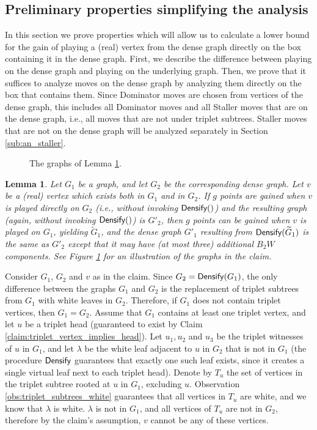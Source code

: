 \documentclass[11pt]{article}
\def\Proof{\par\noindent{\bf Proof:~}}
\newtheorem{lemma}[theorem]{Lemma}
\theoremstyle{definition}
\def\densify{\mbox{\sf Densify}}
\begin{document}
\subsection{Preliminary properties simplifying the analysis}
\label{sub:an_simplify}

In this section we prove properties which will allow us to calculate a lower bound for the gain of playing a (real) vertex from the dense graph directly on the box containing it in the dense graph.
First, we describe the difference between playing on the dense graph and playing on the underlying graph.
Then, we prove that it suffices to analyze moves on the dense graph by analyzing them directly on the box that contains them.
Since Dominator moves are chosen from vertices of the dense graph, this includes all Dominator moves and all Staller moves that are on the dense graph, i.e., all moves that are not under triplet subtrees.
Staller moves that are not on the dense graph will be analyzed separately in Section \ref{sub:an_staller}.

\begin{figure}[thbp]
  \caption{\sf The graphs of Lemma \ref{claim:ana_dense}.}
  \medskip
  \centering
  \label{fig:dense_graph_claim}
\end{figure}

\begin{lemma}
\label{claim:ana_dense}
Let $G_1$ be a graph, and let $G_2$ be the corresponding dense graph.
Let $v$ be a (real) vertex which exists both in $G_1$ and in $G_2$.
If $g$ points are gained when $v$ is played directly on $G_2$ (i.e., without invoking $\densify()$) and the resulting graph (again, without invoking $\densify()$) is $G'_2$, 
then $g$ points can be gained when $v$ is played on $G_1$, yielding $\widetilde{G}_1$, and the dense graph $G'_1$ resulting from $\densify(\widetilde{G}_1)$ is the same as $G'_2$ except that it may have (at most three) additional $B_2W$ components.
See Figure \ref{fig:dense_graph_claim} for an illustration of the graphs in the claim.
\end{lemma}
\Proof
Consider $G_1$, $G_2$ and $v$ as in the claim. 
Since $G_2 = \densify(G_1)$, the only difference between the graphs $G_1$ and $G_2$ is the replacement of triplet subtrees from $G_1$ with white leaves in $G_2$.
Therefore, if $G_1$ does not contain triplet vertices, then $G_1 = G_2$.
Assume that $G_1$ contains at least one triplet vertex, and let $u$ be a triplet head (guaranteed to exist by Claim \ref{claim:triplet_vertex_implies_head}).
Let $u_1, u_2$ and $u_3$ be the triplet witnesses of $u$ in $G_1$, and let $\lambda$ be the white leaf adjacent to $u$ in $G_2$ that is not in $G_1$ 
(the procedure $\densify$ guarantees that exactly one such leaf exists, since it creates a single virtual leaf next to each triplet head).
Denote by $T_u$ the set of vertices in the triplet subtree rooted at $u$ in $G_1$, excluding $u$.
Observation \ref{obs:triplet_subtrees_white} guarantees that all vertices in $T_u$ are white, and we know that $\lambda$ is white.
$\lambda$ is not in $G_1$, and all vertices of $T_u$ are not in $G_2$, therefore by the claim's assumption, $v$ cannot be any of these vertices.
\end{document}
